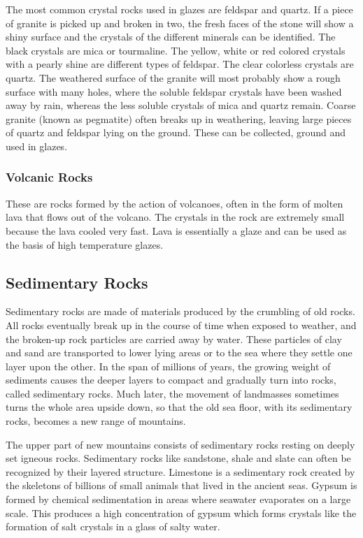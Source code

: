 The most common crystal rocks used in glazes are feldspar and quartz. If a 
piece of granite is picked up and broken in two, the fresh faces of the stone 
will show a shiny surface and the crystals of the different minerals can be 
identified. The black crystals are mica or tourmaline. The yellow, white or red 
colored crystals with a pearly shine are different types of feldspar. The clear 
colorless crystals are quartz. The weathered surface of the granite will most 
probably show a rough surface with many holes, where the soluble feldspar 
crystals have been washed away by rain, whereas the less soluble crystals of 
mica and quartz remain. Coarse granite (known as pegmatite) often breaks up in 
weathering, leaving large pieces of quartz and feldspar lying on the ground. 
These can be collected, ground and used in glazes.
\subsubsection{Volcanic Rocks}
These are rocks formed by the action of volcanoes, often in the form of molten 
lava that flows out of the volcano. The crystals in the rock are extremely 
small because the lava cooled very fast. Lava is essentially a glaze and can be 
used as the basis of high temperature glazes.
\subsection{Sedimentary Rocks}
Sedimentary rocks are made of materials produced by the crumbling of old rocks. 
All rocks eventually break up in the course of time when exposed to weather, 
and the broken-up rock particles are carried away by water. These particles of 
clay and sand are transported to lower lying areas or to the sea where they 
settle one layer upon the other. In the span of millions of years, the growing 
weight of sediments causes the deeper layers to compact and gradually turn into 
rocks, called sedimentary rocks. Much later, the movement of landmasses 
sometimes turns the whole area upside down, so that the old sea floor, with its 
sedimentary rocks, becomes a new range of mountains.

The upper part of new mountains consists of sedimentary rocks resting on deeply 
set igneous rocks. Sedimentary rocks like sandstone, shale and slate can often 
be recognized by their layered structure. Limestone is a sedimentary rock 
created by the skeletons of billions of small animals that lived in the ancient 
seas. Gypsum is formed by chemical sedimentation in areas where seawater 
evaporates on a large scale. This produces a high concentration of gypsum which 
forms crystals like the formation of salt crystals in a glass of salty water.

